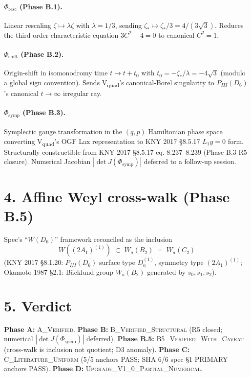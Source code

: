 \documentclass[11pt]{article}
\begin{document}
\paragraph{$\Phi_{\mathrm{resc}}$ (Phase B.1).} Linear rescaling
$\zeta \mapsto \lambda \zeta$ with $\lambda = 1/3$, sending $\zeta_{*}
\mapsto \zeta_{*}/3 = 4/(3\sqrt{3})$. Reduces the third-order
characteristic equation $3 C^{2} - 4 = 0$ to canonical $C^{2} = 1$.

\paragraph{$\Phi_{\mathrm{shift}}$ (Phase B.2).} Origin-shift in
isomonodromy time $t \mapsto t + t_{0}$ with $t_{0} = -\zeta_{*}/\lambda
= -4\sqrt{3}$ (modulo a global sign convention). Sends V\textsubscript{quad}'s
canonical-Borel singularity to $P_{III}(D_{6})$'s canonical
$t \to \infty$ irregular ray.

\paragraph{$\Phi_{\mathrm{symp}}$ (Phase B.3).} Symplectic gauge
transformation in the $(q, p)$ Hamiltonian phase space converting
V\textsubscript{quad}'s OGF Lax representation to KNY 2017 §8.5.17
$L_{1} y = 0$ form. Structurally constructible from KNY 2017 §8.5.17
eq. 8.237–8.239 (Phase B.3 R5 closure). Numerical Jacobian
$|\det J(\Phi_{\mathrm{symp}})|$ deferred to a follow-up session.

\section*{4. Affine Weyl cross-walk (Phase B.5)}

Spec's ``$W(D_{6})$'' framework reconciled as the inclusion
\[
W((2A_{1})^{(1)}) \;\subset\; W_{a}(B_{2}) \;=\; W_{a}(C_{2})
\]
(KNY 2017 §8.1.20: $P_{III}(D_{6})$ surface type $D_{6}^{(1)}$,
symmetry type $(2 A_{1})^{(1)}$; Okamoto 1987 §2.1: Bäcklund
group $W_{a}(B_{2})$ generated by $s_{0}, s_{1}, s_{2}$).

\section*{5. Verdict}

\textbf{Phase A:} \textsc{A\_Verified}. \textbf{Phase B:}
\textsc{B\_Verified\_Structural} (R5 closed; numerical
$|\det J(\Phi_{\mathrm{symp}})|$ deferred).
\textbf{Phase B.5:} \textsc{B5\_Verified\_With\_Caveat} (cross-walk
is inclusion not quotient; D3 anomaly).
\textbf{Phase C:} \textsc{C\_Literature\_Uniform} (5/5 anchors
PASS; SHA 6/6 spec §1 PRIMARY anchors PASS).
\textbf{Phase D:} \textsc{Upgrade\_V1\_0\_Partial\_Numerical}.
\end{document}
